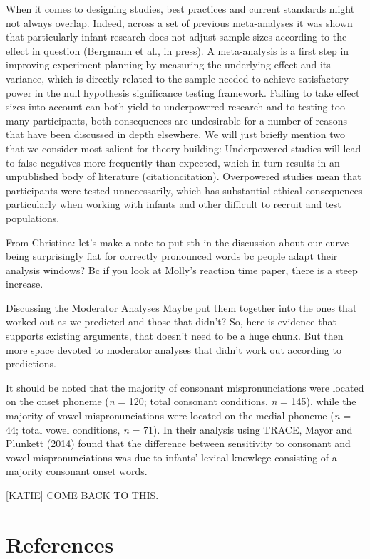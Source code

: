 \documentclass[man]{apa6}
\theoremstyle{definition}
\theoremstyle{definition}
\theoremstyle{definition}
\theoremstyle{remark}
\begin{document}
When it comes to designing studies, best practices and current standards
might not always overlap. Indeed, across a set of previous meta-analyses
it was shown that particularly infant research does not adjust sample
sizes according to the effect in question (Bergmann et al., in press). A
meta-analysis is a first step in improving experiment planning by
measuring the underlying effect and its variance, which is directly
related to the sample needed to achieve satisfactory power in the null
hypothesis significance testing framework. Failing to take effect sizes
into account can both yield to underpowered research and to testing too
many participants, both consequences are undesirable for a number of
reasons that have been discussed in depth elsewhere. We will just
briefly mention two that we consider most salient for theory building:
Underpowered studies will lead to false negatives more frequently than
expected, which in turn results in an unpublished body of literature
(citationcitation). Overpowered studies mean that participants were
tested unnecessarily, which has substantial ethical consequences
particularly when working with infants and other difficult to recruit
and test populations.

From Christina: let's make a note to put sth in the discussion about our
curve being surprisingly flat for correctly pronounced words bc people
adapt their analysis windows? Bc if you look at Molly's reaction time
paper, there is a steep increase.

Discussing the Moderator Analyses Maybe put them together into the ones
that worked out as we predicted and those that didn't? So, here is
evidence that supports existing arguments, that doesn't need to be a
huge chunk. But then more space devoted to moderator analyses that
didn't work out according to predictions.

It should be noted that the majority of consonant mispronunciations were
located on the onset phoneme (\emph{n} = 120; total consonant
conditions, \emph{n} = 145), while the majority of vowel
mispronunciations were located on the medial phoneme (\emph{n} = 44;
total vowel conditions, \emph{n} = 71). In their analysis using TRACE,
Mayor and Plunkett (2014) found that the difference between sensitivity
to consonant and vowel mispronunciations was due to infants' lexical
knowlege consisting of a majority consonant onset words.

{[}KATIE{]} COME BACK TO THIS.

\newpage

\section{References}\label{references}

\begingroup
\setlength{\parindent}{-0.5in} \setlength{\leftskip}{0.5in}

\hypertarget{refs}{}

\endgroup
\end{document}
